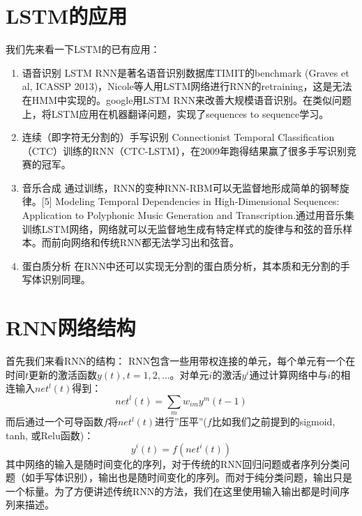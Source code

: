 \section{LSTM的应用}

我们先来看一下LSTM的已有应用：

\begin{enumerate}
\item{语音识别}
LSTM RNN是著名语音识别数据库TIMIT的benchmark (Graves et al, ICASSP 2013)，Nicole等人用LSTM网络进行RNN的retraining\cite{beringer2005classifying}，这是无法在HMM中实现的。google用LSTM RNN来改善大规模语音识别\cite{sak2014long}。在类似问题上，\cite{sutskever2014sequence}将LSTM应用在机器翻译问题，实现了sequences to sequence学习。



\item{连续（即字符无分割的）手写识别}
Connectionist Temporal Classification（CTC）\cite{graves2012connectionist}训练的RNN（CTC-LSTM）\cite{bluche2014a2ia}，在2009年跑得结果赢了很多手写识别竞赛的冠军\cite{graves2006connectionist}。



\item{音乐合成}
通过训练，RNN的变种RNN-RBM可以无监督地形成简单的钢琴旋律。[5] Modeling Temporal Dependencies in High-Dimensional Sequences: Application to Polyphonic Music Generation and Transcription.通过用音乐集训练LSTM网络，网络就可以无监督地生成有特定样式的旋律与和弦的音乐样本。而前向网络和传统RNN都无法学习出和弦音。\cite{eck2002first}



\item{蛋白质分析}
在RNN中还可以实现无分割的蛋白质分析\cite{hochreiter2007fast}，其本质和无分割的手写体识别同理。

\end{enumerate}






\section{RNN网络结构}

首先我们来看RNN的结构：
RNN包含一些用带权连接的单元，每个单元有一个在时间$t$更新的激活函数$y(t), t=1,2,…$。对单元$i$的激活$y^{i}$通过计算网络中与$i$的相连输入$net^{l}(t)$得到：
\begin{equation}
	net^{l}(t) = \sum_m{w_{im}y^m(t-1)}
\end{equation}
而后通过一个可导函数$f$将$net^{l}(t)$进行”压平”($f$比如我们之前提到的sigmoid, tanh, 或Relu函数)：
\begin{equation}
	y^{i}(t) = f(net^i(t))
\end{equation}
其中网络的输入是随时间变化的序列，对于传统的RNN回归问题或者序列分类问题（如手写体识别），输出也是随时间变化的序列。而对于纯分类问题，输出只是一个标量。为了方便讲述传统RNN的方法，我们在这里使用输入输出都是时间序列来描述。

